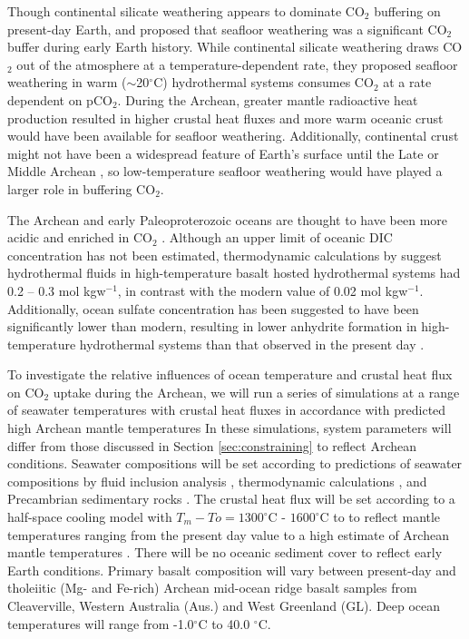 \documentclass[authoryear,round,12pt]{article}
\begin{document}
Though continental silicate weathering appears to dominate CO$_2$
buffering on present-day Earth, \citet{sleep2001} and
\citet{zahnle2002} proposed that seafloor weathering was a significant
CO$_2$ buffer during early Earth history. While continental silicate
weathering draws CO$_2$ out of the atmosphere at a
temperature-dependent rate, they proposed seafloor weathering in warm
($\sim$20$^{\circ}$C) hydrothermal systems consumes CO$_2$ at a rate
dependent on pCO$_2$. During the Archean, greater mantle radioactive
heat production resulted in higher crustal heat fluxes
\citep{mckenzie1974, bickle1986} and more warm oceanic crust would
have been available for seafloor weathering. Additionally, continental
crust might not have been a widespread feature of Earth's surface
until the Late or Middle Archean \citep{zegers2001}, so
low-temperature seafloor weathering would have played a larger role in
buffering CO$_2$.

The Archean and early Paleoproterozoic oceans are thought to have been
more acidic and enriched in CO$_2$ \citep{grotzinger1993}. Although an
upper limit of oceanic DIC concentration has not been estimated,
thermodynamic calculations by \citet{shibuya2010} suggest hydrothermal
fluids in high-temperature basalt hosted hydrothermal systems had 0.2
-- 0.3 mol kgw$^{-1}$, in contrast with the modern value of 0.02 mol
kgw$^{-1}$. Additionally, ocean sulfate concentration has been
suggested to have been significantly lower than modern, resulting in
lower anhydrite formation in high-temperature hydrothermal systems
than that observed in the present day \citep{grotzinger1993,
  arvidson2006}.


To investigate the relative influences of ocean temperature and
crustal heat flux on CO$_2$ uptake during the Archean, we will run a
series of simulations at a range of seawater temperatures with crustal
heat fluxes in accordance with predicted high Archean mantle
temperatures In these simulations, system parameters will differ from
those discussed in Section \ref{sec:constraining} to reflect Archean
conditions. Seawater compositions will be set according to predictions
of seawater compositions by fluid inclusion analysis
\citep{deronde1997}, thermodynamic calculations \citep{shibuya2010},
and Precambrian sedimentary rocks \citep{grotzinger1993}. The crustal
heat flux will be set according to a half-space cooling model with
$T_m - To = 1300^{\circ}$C -  $1600^{\circ}$C to to reflect mantle temperatures ranging
from the present day value to a high estimate of Archean mantle temperatures 
\citep{hoffman1988}. There will be no oceanic sediment cover to reflect early Earth 
conditions. Primary basalt 
composition will vary between present-day and tholeiitic (Mg- and Fe-rich) Archean
mid-ocean ridge basalt samples from Cleaverville, Western Australia (Aus.)
\citep{ohta1996} and West Greenland \citep{komiya2004} (GL). Deep ocean
temperatures will range from -1.0$^{\circ}$C to 40.0 $^{\circ}$C.
\end{document}
